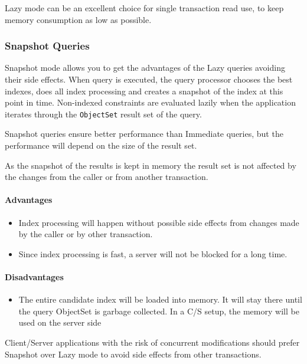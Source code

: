 Lazy mode can be an excellent choice for single transaction read use, to keep memory consumption as low as possible.

\subsubsection{Snapshot Queries}
\label{ref:configuration-common-query-modes-snapshot-queries}

Snapshot mode allows you to get the advantages of the Lazy queries avoiding their side effects. When query is executed, the query processor chooses the best indexes, does all index processing and creates a snapshot of the index at this point in time. Non-indexed constraints are evaluated lazily when the application iterates through the \texttt{ObjectSet} result set of the query.

Snapshot queries ensure better performance than Immediate queries, but the performance will depend on the size of the result set.

As the snapshot of the results is kept in memory the result set is not affected by the changes from the caller or from another transaction.

\paragraph*{Advantages}

\begin{itemize}
\item Index processing will happen without possible side effects from changes made by the caller or by other transaction.
\item Since index processing is fast, a server will not be blocked for a long time.
\end{itemize}

\paragraph*{Disadvantages}

\begin{itemize}
\item The entire candidate index will be loaded into memory. It will stay there until the query ObjectSet is garbage collected. In a C/S setup, the memory will be used on the server side
\end{itemize}

Client/Server applications with the risk of concurrent modifications should prefer Snapshot over Lazy mode to avoid side effects from other transactions.

